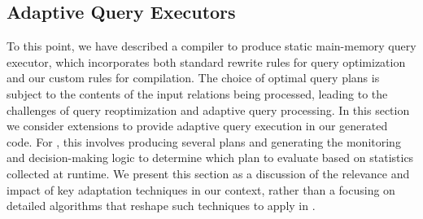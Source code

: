 \subsection{Adaptive Query Executors}

To this point, we have described a compiler to produce static main-memory query
executor, which incorporates both standard rewrite rules for query optimization
and our custom rules for compilation. The choice of optimal query plans is
subject to the contents of the input relations being processed, leading to the
challenges of query reoptimization and adaptive query processing. In this section
we consider extensions to provide adaptive query execution in our generated code.
For \compiler, this involves producing several plans and generating the
monitoring and decision-making logic to determine which plan to evaluate based on
statistics collected at runtime. We present this section as a discussion of the
relevance and impact of key adaptation techniques in our context, rather than a
focusing on detailed algorithms that reshape such techniques to apply in
\compiler.

